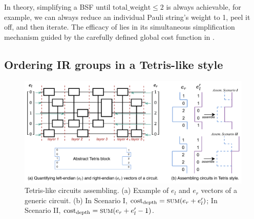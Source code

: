 \documentclass[conference,9pt]{IEEEtran}
\newcommand{\totalWeight}{\mathrm{total\_weight}}
\newcommand{\eRrightPre}{e_r}
\newcommand{\eLeftPost}{e_l'}
\begin{document}
    In theory, simplifying a BSF until $ \totalWeight \leq 2$ is always achievable, for example, we can always reduce an individual Pauli string's weight to 1, peel it off, and then iterate. The efficacy of  lies in its simultaneous simplification mechanism guided by the carefully defined global cost function in . 



\subsection{Ordering IR groups in a Tetris-like style}

    \begin{figure}[tbp]
        \centering        
        \includegraphics[width=\columnwidth]{figures/empty_end.pdf}
        \caption{Tetris-like circuits assembling. (a) Example of $ e_l $ and $ e_r $ vectors of a generic circuit. (b) In Scenario I, $ \mathrm{cost}_\mathrm{depth} = \textsc{sum}(\eRrightPre + \eLeftPost) $; In Scenario II, $ \mathrm{cost}_\mathrm{depth} = \textsc{sum}(\eRrightPre + \eLeftPost - 1)  $.}%
        \label{fig:empty-end}
    \end{figure}
\end{document}
